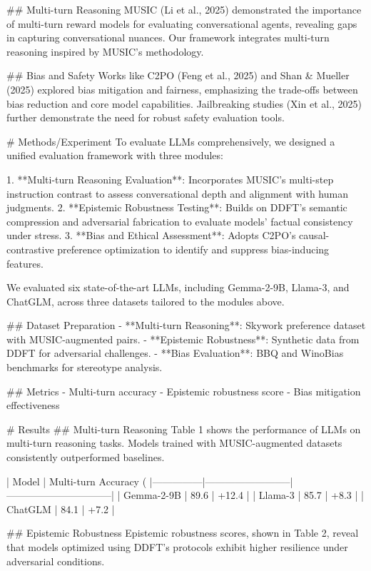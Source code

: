 ## Multi-turn Reasoning
MUSIC (Li et al., 2025) demonstrated the importance of multi-turn reward models for evaluating conversational agents, revealing gaps in capturing conversational nuances. Our framework integrates multi-turn reasoning inspired by MUSIC's methodology.

## Bias and Safety
Works like C2PO (Feng et al., 2025) and Shan & Mueller (2025) explored bias mitigation and fairness, emphasizing the trade-offs between bias reduction and core model capabilities. Jailbreaking studies (Xin et al., 2025) further demonstrate the need for robust safety evaluation tools.

# Methods/Experiment
To evaluate LLMs comprehensively, we designed a unified evaluation framework with three modules:

1. **Multi-turn Reasoning Evaluation**: Incorporates MUSIC's multi-step instruction contrast to assess conversational depth and alignment with human judgments.
2. **Epistemic Robustness Testing**: Builds on DDFT's semantic compression and adversarial fabrication to evaluate models' factual consistency under stress.
3. **Bias and Ethical Assessment**: Adopts C2PO's causal-contrastive preference optimization to identify and suppress bias-inducing features.

We evaluated six state-of-the-art LLMs, including Gemma-2-9B, Llama-3, and ChatGLM, across three datasets tailored to the modules above.

## Dataset Preparation
- **Multi-turn Reasoning**: Skywork preference dataset with MUSIC-augmented pairs.
- **Epistemic Robustness**: Synthetic data from DDFT for adversarial challenges.
- **Bias Evaluation**: BBQ and WinoBias benchmarks for stereotype analysis.

## Metrics
- Multi-turn accuracy
- Epistemic robustness score
- Bias mitigation effectiveness

# Results
## Multi-turn Reasoning
Table 1 shows the performance of LLMs on multi-turn reasoning tasks. Models trained with MUSIC-augmented datasets consistently outperformed baselines.

| Model         | Multi-turn Accuracy (%
|---------------|--------------------------|--------------------------------|
| Gemma-2-9B    | 89.6                    | +12.4                          |
| Llama-3       | 85.7                    | +8.3                           |
| ChatGLM       | 84.1                    | +7.2                           |

## Epistemic Robustness
Epistemic robustness scores, shown in Table 2, reveal that models optimized using DDFT's protocols exhibit higher resilience under adversarial conditions.


